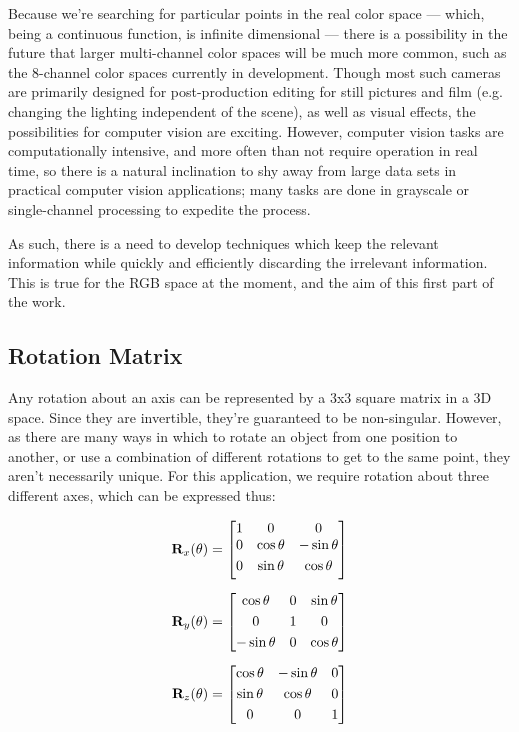 Because we're searching for particular points in the real color space --- which, being a continuous function, is infinite dimensional --- there is a possibility in the future that larger multi-channel color spaces will be much more common, such as the 8-channel color spaces currently in development. Though most such cameras are primarily designed for post-production editing for still pictures and film (e.g. changing the lighting independent of the scene), as well as visual effects, the possibilities for computer vision are exciting. However, computer vision tasks are computationally intensive, and more often than not require operation in real time, so there is a natural inclination to shy away from large data sets in practical computer vision applications; many tasks are done in grayscale or single-channel processing to expedite the process.

As such, there is a need to develop techniques which keep the relevant information while quickly and efficiently discarding the irrelevant information. This is true for the RGB space at the moment, and the aim of this first part of the work.


\subsection{Rotation Matrix}\label{sec:RotationMatrix}
Any rotation about an axis can be represented by a 3x3 square matrix in a 3D space. Since they are invertible, they're guaranteed to be non-singular. However, as there are many ways in which to rotate an object from one position to another, or use a combination of different rotations to get to the same point, they aren't necessarily unique. For this application, we require rotation about three different axes, which can be expressed thus:


\begin{alignat}{1}
\R_x(\theta) &= \begin{bmatrix}
1 & 0 & 0 \\
0 & \cos \theta &  -\sin \theta \\[3pt]
0 & \sin \theta  &  \cos \theta \\[3pt]
\end{bmatrix} \\[6pt]
\R_y(\theta) &= \begin{bmatrix}
\cos \theta & 0 & \sin \theta \\[3pt]
0 & 1 & 0 \\[3pt]
-\sin \theta & 0 & \cos \theta \\
\end{bmatrix} \\[6pt]
\R_z(\theta) &= \begin{bmatrix}
\cos \theta &  -\sin \theta & 0 \\[3pt]
\sin \theta & \cos \theta & 0\\[3pt]
0 & 0 & 1\\
\end{bmatrix}
\end{alignat}


